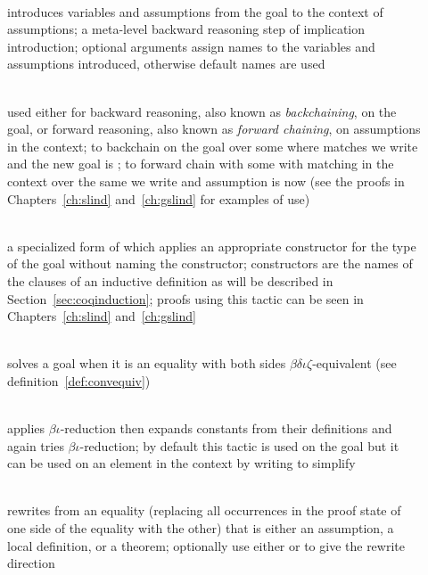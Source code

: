 \begin{description}
 \item[] ~\\
  introduces variables and assumptions from the goal to the context of assumptions; a meta-level backward reasoning step of implication introduction; optional arguments assign names to the variables and assumptions introduced, otherwise default names are used
 \item[] ~\\
  used either for backward reasoning, also known as \emph{backchaining}, on the goal, or forward reasoning, also known as \emph{forward chaining}, on assumptions in the context; to backchain on the goal  over some  where  matches  we write  and the new goal is ; to forward chain with some  with  matching  in the context over the same  we write  and assumption  is now  (see the proofs in Chapters~\ref{ch:slind} and~\ref{ch:gslind} for examples of use)
 \item[] ~\\
  a specialized form of  which applies an appropriate constructor for the type of the goal without naming the constructor; constructors are the names of the clauses of an inductive definition as will be described in Section~\ref{sec:coqinduction}; proofs using this tactic can be seen in Chapters~\ref{ch:slind} and~\ref{ch:gslind}
 \item[] ~\\
  solves a goal when it is an equality with both sides $\beta\delta\iota\zeta$-equivalent (see definition~\ref{def:convequiv})
 \item[] ~\\
  applies $\beta\iota$-reduction then expands constants from their definitions and again tries $\beta\iota$-reduction; by default this tactic is used on the goal but it can be used on an element  in the context by writing  to simplify 
 \item[] ~\\
  rewrites from an equality (replacing all occurrences in the proof state of one side of the equality with the other) that is either an assumption, a local definition, or a theorem; optionally use either \coqtm{<-} or \coqtm{->} to give the rewrite direction

\end{description}
